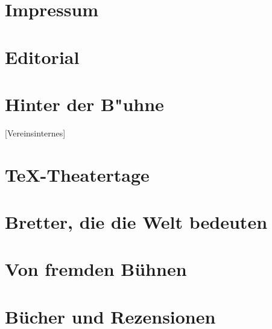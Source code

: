 \documentclass[%
full,fleqn,08,ngerman]{dtk}
\begin{document}

\part{Impressum}
\vspace*{-2mm}

\part{Editorial}
\markboth{}{}

\clearpage


\part[Hinter der B"uhne]{Hinter der B"uhne}[Vereinsinternes]
\bgroup
{}
\clearpage
{}
\egroup

\part{\TeX-Theatertage}
\bgroup
{}
\egroup


\part{Bretter, die die Welt bedeuten}


\bgroup
{}
\egroup

\clearpage


\clearpage

\part{Von fremden Bühnen}
\vspace*{-4ex}
\bgroup
{}
\egroup


\part{Bücher und Rezensionen}
\end{document}
